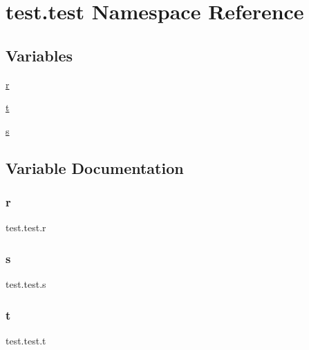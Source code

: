\hypertarget{namespacetest_1_1test}{}\section{test.\+test Namespace Reference}
\label{namespacetest_1_1test}
\subsection*{Variables}
\begin{DoxyCompactItemize}
\item 
\hyperlink{namespacetest_1_1test_ac6940ca06224277c08c299101b3296b4}{r}
\item 
\hyperlink{namespacetest_1_1test_a85ce85cce39e2fad621db9c70186235a}{t}
\item 
\hyperlink{namespacetest_1_1test_a4e3f76bc561357031de5269619280f91}{s}
\end{DoxyCompactItemize}


\subsection{Variable Documentation}
\mbox{\label{namespacetest_1_1test_ac6940ca06224277c08c299101b3296b4}} 
\subsubsection{\texorpdfstring{r}{r}}
{\footnotesize\ttfamily test.\+test.\+r}

\mbox{\label{namespacetest_1_1test_a4e3f76bc561357031de5269619280f91}} 
\subsubsection{\texorpdfstring{s}{s}}
{\footnotesize\ttfamily test.\+test.\+s}

\mbox{\label{namespacetest_1_1test_a85ce85cce39e2fad621db9c70186235a}} 
\subsubsection{\texorpdfstring{t}{t}}
{\footnotesize\ttfamily test.\+test.\+t}

